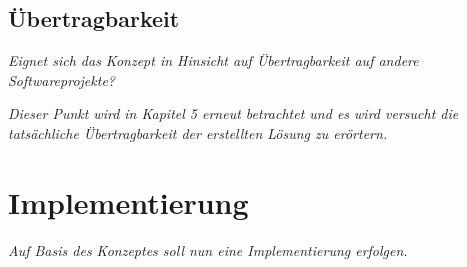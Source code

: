	\subsection{Übertragbarkeit}

	\textit{Eignet sich das Konzept in Hinsicht auf Übertragbarkeit auf andere Softwareprojekte?}

	\textit{Dieser Punkt wird in Kapitel 5 erneut betrachtet und es wird versucht die tatsächliche Übertragbarkeit der erstellten Lösung zu erörtern.}

\section{Implementierung}

	\textit{Auf Basis des Konzeptes soll nun eine Implementierung erfolgen.}